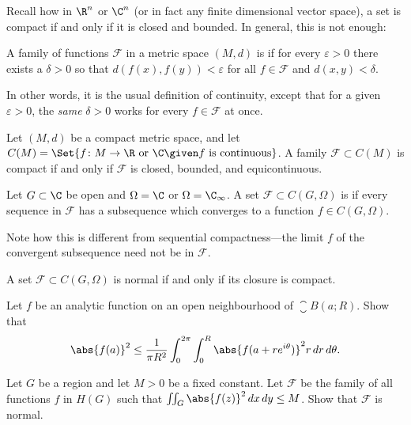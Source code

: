 Recall how in $\R^n$ or $\C^n$ (or in fact any finite dimensional vector space), a set is compact if and only if it is closed and bounded.
In general, this is not enough:

\begin{definition}[Equicontinuity]
	A family of functions $\mathcal{F}$ in a metric space $(M, d)$ is  if for every $\varepsilon > 0$ there exists a $\delta > 0$ so that $d(f(x), f(y)) < \varepsilon$ for all $f \in \mathcal{F}$ and $d(x, y) < \delta$.

	In other words, it is the usual definition of continuity, except that for a given $\varepsilon > 0$, the \emph{same} $\delta > 0$ works for every $f \in \mathcal{F}$ at once.
\end{definition}

\begin{theorem}\label{arzelaascoli}
	Let $(M, d)$ be a compact metric space, and let $C(M) = \Set{f \colon M \to \R \text{ or } \C \given f \text{ is continuous}}$.
	A family $\mathcal{F} \subset C(M)$ is compact if and only if $\mathcal{F}$ is closed, bounded, and equicontinuous.
\end{theorem}

\begin{definition}[Normal]
	Let $G \subset \C$ be open and $\Omega = \C$ or $\Omega = \C_\infty$.
	A set $\mathcal{F} \subset C(G, \Omega)$ is  if every sequence in $\mathcal{F}$ has a subsequence which converges to a function $f \in C(G, \Omega)$.
\end{definition}

Note how this is different from sequential compactness---the limit $f$ of the convergent subsequence need not be in $\mathcal{F}$.

\begin{exercise}
	A set $\mathcal{F} \subset C(G, \Omega)$ is normal if and only if its closure is compact.
\end{exercise}


\begin{exercise}
	\begin{parts}
		\item Let $f$ be an analytic function on an open neighbourhood of $\closure{B(a; R)}$.
		Show that
		\[
			\abs{f(a)}^2 \leq \frac{1}{\pi R^2} \int_0^{2 \pi} \int_0^R \abs{f(a + r e^{i \theta})}^2 r \, d r \, d \theta.
		\]
		\item Let $G$ be a region and let $M > 0$ be a fixed constant.
		Let $\mathcal{F}$ be the family of all functions $f$ in $H(G)$ such that $\iint_G \abs{f(z)}^2 \, d x \, d y \leq M$.
		Show that $\mathcal{F}$ is normal. \qedhere
	\end{parts}
\end{exercise}

